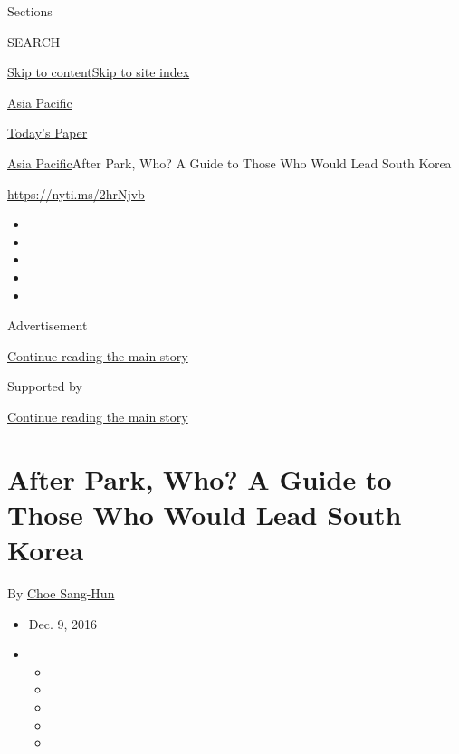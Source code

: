 Sections

SEARCH

\protect\hyperlink{site-content}{Skip to
content}\protect\hyperlink{site-index}{Skip to site index}

\href{https://www.nytimes.com/section/world/asia}{Asia Pacific}

\href{https://myaccount.nytimes.com/auth/login?response_type=cookie\&client_id=vi}{}

\href{https://www.nytimes.com/section/todayspaper}{Today's Paper}

\href{/section/world/asia}{Asia Pacific}\textbar{}After Park, Who? A
Guide to Those Who Would Lead South Korea

\url{https://nyti.ms/2hrNjvb}

\begin{itemize}
\item
\item
\item
\item
\item
\end{itemize}

Advertisement

\protect\hyperlink{after-top}{Continue reading the main story}

Supported by

\protect\hyperlink{after-sponsor}{Continue reading the main story}

\hypertarget{after-park-who-a-guide-to-those-who-would-lead-south-korea}{%
\section{After Park, Who? A Guide to Those Who Would Lead South
Korea}\label{after-park-who-a-guide-to-those-who-would-lead-south-korea}}

By \href{http://www.nytimes.com/by/choe-sang-hun}{Choe Sang-Hun}

\begin{itemize}
\item
  Dec. 9, 2016
\item
  \begin{itemize}
  \item
  \item
  \item
  \item
  \item
  \end{itemize}
\end{itemize}

